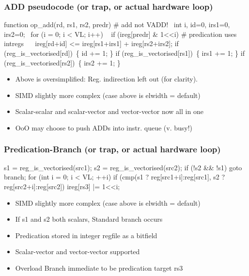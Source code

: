 \documentclass[slidestop]{beamer}
\begin{document}
\begin{frame}[fragile]
\frametitle{ADD pseudocode (or trap, or actual hardware loop)}

\begin{semiverbatim}
function op\_add(rd, rs1, rs2, predr) # add not VADD!
  int i, id=0, irs1=0, irs2=0;
  for (i = 0; i < VL; i++)
    if (ireg[predr] & 1<<i) # predication uses intregs
       ireg[rd+id] <= ireg[rs1+irs1] + ireg[rs2+irs2];
    if (reg\_is\_vectorised[rd]) \{ id += 1; \}
    if (reg\_is\_vectorised[rs1]) \{ irs1 += 1; \}
    if (reg\_is\_vectorised[rs2]) \{ irs2 += 1; \}
\end{semiverbatim}

  \begin{itemize}
   \item Above is oversimplified: Reg. indirection left out (for clarity).
   \item SIMD slightly more complex (case above is elwidth = default)
   \item Scalar-scalar and scalar-vector and vector-vector now all in one
   \item OoO may choose to push ADDs into instr. queue (v. busy!)
  \end{itemize}
\end{frame}



\begin{frame}[fragile]
\frametitle{Predication-Branch (or trap, or actual hardware loop)}

\begin{semiverbatim}
s1 = reg\_is\_vectorised(src1);
s2 = reg\_is\_vectorised(src2);
if (!s2 && !s1) goto branch;
for (int i = 0; i < VL; ++i)
  if (cmp(s1 ? reg[src1+i]:reg[src1],
          s2 ? reg[src2+i]:reg[src2])
         ireg[rs3] |= 1<<i;
\end{semiverbatim}

  \begin{itemize}
   \item SIMD slightly more complex (case above is elwidth = default)  
   \item If s1 and s2 both scalars, Standard branch occurs
   \item Predication stored in integer regfile as a bitfield
   \item Scalar-vector and vector-vector supported
   \item Overload Branch immediate to be predication target rs3
  \end{itemize}
\end{frame}
\end{document}
